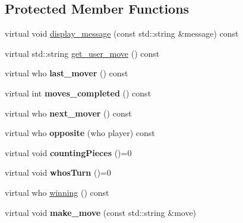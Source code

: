 \subsection*{Protected Member Functions}
\begin{DoxyCompactItemize}
\item 
virtual void \mbox{\hyperlink{classmain__savitch__14_1_1game_ac58bfc07db8e604b07d2039b2cf7ab51}{display\+\_\+message}} (const std\+::string \&message) const
\item 
virtual std\+::string \mbox{\hyperlink{classmain__savitch__14_1_1game_a6504d401fcc8b138ae6342c2868c8a40}{get\+\_\+user\+\_\+move}} () const
\item 
\mbox{\label{classmain__savitch__14_1_1game_a5c1ab8b36fb977bbe9fe387e793e4ee5}} 
virtual who {\bfseries last\+\_\+mover} () const
\item 
\mbox{\label{classmain__savitch__14_1_1game_a31dd5382cc6d64a6d58bcee55383cf1b}} 
virtual int {\bfseries moves\+\_\+completed} () const
\item 
\mbox{\label{classmain__savitch__14_1_1game_a4e68409618474d19742dd5f75f92f5c9}} 
virtual who {\bfseries next\+\_\+mover} () const
\item 
\mbox{\label{classmain__savitch__14_1_1game_a98469e89e13c73a5ee70407a2164888c}} 
virtual who {\bfseries opposite} (who player) const
\item 
\mbox{\label{classmain__savitch__14_1_1game_a5954eccb6abf1ae900ad853ad2af99fa}} 
virtual void {\bfseries counting\+Pieces} ()=0
\item 
\mbox{\label{classmain__savitch__14_1_1game_a98190a2bf784ce0f20533475754d136d}} 
virtual void {\bfseries whos\+Turn} ()=0
\item 
virtual who \mbox{\hyperlink{classmain__savitch__14_1_1game_a2f0d5338c12bd98d52fe2383ece5c45e}{winning}} () const
\item 
\mbox{\label{classmain__savitch__14_1_1game_a20597d0caa907aea47b27fed8be3759b}} 
virtual void {\bfseries make\+\_\+move} (const std\+::string \&move)

\end{DoxyCompactItemize}
